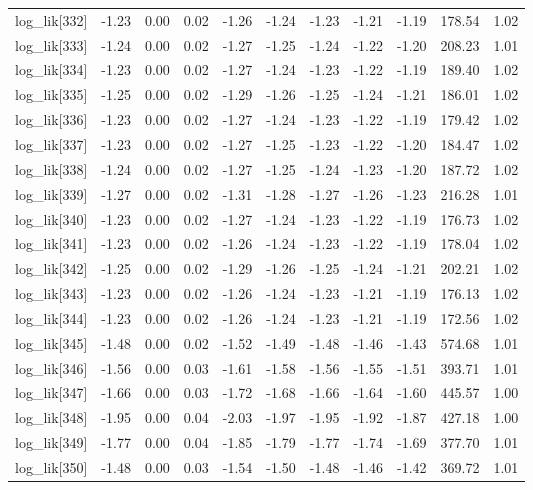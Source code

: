 \begin{table}[ht]
\begin{tabular}{rrrrrrrrrrr}
  log\_lik[332] & -1.23 & 0.00 & 0.02 & -1.26 & -1.24 & -1.23 & -1.21 & -1.19 & 178.54 & 1.02 \\ 
  log\_lik[333] & -1.24 & 0.00 & 0.02 & -1.27 & -1.25 & -1.24 & -1.22 & -1.20 & 208.23 & 1.01 \\ 
  log\_lik[334] & -1.23 & 0.00 & 0.02 & -1.27 & -1.24 & -1.23 & -1.22 & -1.19 & 189.40 & 1.02 \\ 
  log\_lik[335] & -1.25 & 0.00 & 0.02 & -1.29 & -1.26 & -1.25 & -1.24 & -1.21 & 186.01 & 1.02 \\ 
  log\_lik[336] & -1.23 & 0.00 & 0.02 & -1.27 & -1.24 & -1.23 & -1.22 & -1.19 & 179.42 & 1.02 \\ 
  log\_lik[337] & -1.23 & 0.00 & 0.02 & -1.27 & -1.25 & -1.23 & -1.22 & -1.20 & 184.47 & 1.02 \\ 
  log\_lik[338] & -1.24 & 0.00 & 0.02 & -1.27 & -1.25 & -1.24 & -1.23 & -1.20 & 187.72 & 1.02 \\ 
  log\_lik[339] & -1.27 & 0.00 & 0.02 & -1.31 & -1.28 & -1.27 & -1.26 & -1.23 & 216.28 & 1.01 \\ 
  log\_lik[340] & -1.23 & 0.00 & 0.02 & -1.27 & -1.24 & -1.23 & -1.22 & -1.19 & 176.73 & 1.02 \\ 
  log\_lik[341] & -1.23 & 0.00 & 0.02 & -1.26 & -1.24 & -1.23 & -1.22 & -1.19 & 178.04 & 1.02 \\ 
  log\_lik[342] & -1.25 & 0.00 & 0.02 & -1.29 & -1.26 & -1.25 & -1.24 & -1.21 & 202.21 & 1.02 \\ 
  log\_lik[343] & -1.23 & 0.00 & 0.02 & -1.26 & -1.24 & -1.23 & -1.21 & -1.19 & 176.13 & 1.02 \\ 
  log\_lik[344] & -1.23 & 0.00 & 0.02 & -1.26 & -1.24 & -1.23 & -1.21 & -1.19 & 172.56 & 1.02 \\ 
  log\_lik[345] & -1.48 & 0.00 & 0.02 & -1.52 & -1.49 & -1.48 & -1.46 & -1.43 & 574.68 & 1.01 \\ 
  log\_lik[346] & -1.56 & 0.00 & 0.03 & -1.61 & -1.58 & -1.56 & -1.55 & -1.51 & 393.71 & 1.01 \\ 
  log\_lik[347] & -1.66 & 0.00 & 0.03 & -1.72 & -1.68 & -1.66 & -1.64 & -1.60 & 445.57 & 1.00 \\ 
  log\_lik[348] & -1.95 & 0.00 & 0.04 & -2.03 & -1.97 & -1.95 & -1.92 & -1.87 & 427.18 & 1.00 \\ 
  log\_lik[349] & -1.77 & 0.00 & 0.04 & -1.85 & -1.79 & -1.77 & -1.74 & -1.69 & 377.70 & 1.01 \\ 
  log\_lik[350] & -1.48 & 0.00 & 0.03 & -1.54 & -1.50 & -1.48 & -1.46 & -1.42 & 369.72 & 1.01 \\ 

\end{tabular}
\end{table}
